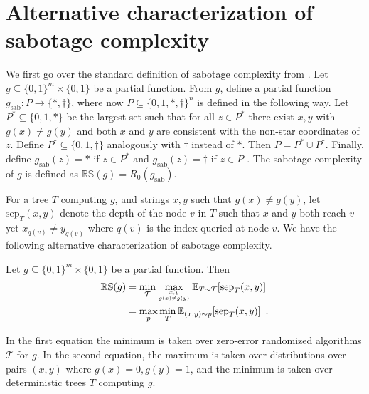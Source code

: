 \documentclass{toc}
\newcommand{\clT}{\mathcal{T}}
\newcommand{\RS}{\mathbb{RS}}
\newcommand{\sep}{\mathrm{sep}}
\newcommand{\sab}{\mathrm{sab}}
\newcommand{\E}{\mathbb{E}}
\begin{document}
\section{Alternative characterization of sabotage complexity}
\label{app:sabotage}
We first go over the standard definition of sabotage complexity from \cite{DBLP:conf/icalp/Ben-DavidK16}.
Let $g \subseteq \{0,1\}^m \times \{0,1\}$ be a partial function.  From $g$, define a partial 
function $g_{\sab} :  P \rightarrow \{\ast,\dagger\}$, where now $P \subseteq \{0,1,\ast, \dagger\}^n$ is defined in the following way.  Let $P^{\ast} \subseteq \{0,1,\ast\}$ 
be the largest set such that for all $z \in P^{\ast}$ there exist $x,y$ with $g(x) \ne g(y)$ and both $x$ and $y$ are consistent with the non-star 
coordinates of $z$.  Define $P^{\dagger} \subseteq \{0,1,\dagger\}$ analogously with $\dagger$ instead of $\ast$.  Then $P = P^{\ast} \cup P^{\dagger}$.  Finally, define $g_{\sab}(z) = \ast$ if 
$z \in P^\ast$ and $g_{\sab}(z) = \dagger$ if $z \in P^{\dagger}$.  
The sabotage complexity of $g$ is defined as $\RS(g) = R_0(g_{\sab})$.  

For a tree $T$ computing $g$, and strings $x,y$ such that $g(x) \ne g(y)$, let $\sep_T(x,y)$ denote the depth of the 
node $v$ in $T$ such that $x$ and $y$ both reach $v$ yet $x_{q(v)} \ne y_{q(v)}$ where $q(v)$ is the index queried at node $v$.  
We have the following alternative characterization of sabotage complexity.

\begin{theorem}
\label{thm:alt_sabotage}
Let $g \subseteq \{0,1\}^m \times \{0,1\}$ be a partial function.  Then 
\begin{align*}
\RS(g) &= \min_\clT \max_{x,y \atop g(x) \ne g(y)} \E_{T \sim \clT} [\sep_T(x,y)] \\
&= \max_p \min_T \E_{(x,y) \sim p} [\sep_T(x,y)]\enspace .
\end{align*}
\end{theorem}
In the first equation the minimum is taken over zero-error randomized algorithms $\clT$ for $g$.  In the 
second equation, the maximum is taken over distributions over pairs $(x,y)$ where $g(x)=0, g(y)=1$, and 
the minimum is taken over deterministic trees $T$ computing $g$.
\end{document}
